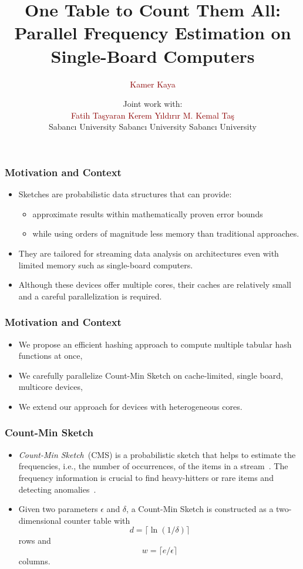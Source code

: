 \documentclass{beamer}
\title[One Table to Count Them All: Parallel Frequency Estimation on Single-Board Computers] %
{One Table to Count Them All: \\Parallel Frequency Estimation on Single-Board Computers}
\author[Kamer Kaya] %
{\textcolor{darkred}{Kamer Kaya}}
\institute[Sabancı University] %
{
  \inst{}%
  Sabancı University, Turkey
}
\date[] %
{
\sepline
 {
 Joint work with: \\ 
 \vspace{4mm}
 \textcolor{darkred}{Fatih Taşyaran} \hspace{9mm} 
 \textcolor{darkred}{Kerem Yıldırır} \hspace{9mm} 
 \textcolor{darkred}{M. Kemal Taş} \\
 \hspace{-0ex}
 {\tiny Sabancı University} \hspace{9ex}
 {\tiny Sabancı University}  \hspace{9ex}
  {\tiny Sabancı University} 
 }
\sepline
 }
\begin{document}
 
\frame{\titlepage}
 
\begin{frame}
	\frametitle{Motivation and Context}
	\begin{itemize}
	\item Sketches are probabilistic data structures that can provide:
	\begin{itemize}
	\item approximate results within mathematically proven error bounds 
	\item while using orders of magnitude less memory than traditional approaches.
	\end{itemize}
	\item They are tailored for streaming data analysis on architectures even with limited memory such as single-board computers.
	\item Although these devices offer multiple cores, their caches are relatively small and a careful parallelization is required.

\end{itemize}
\end{frame}

\begin{frame}
	\frametitle{Motivation and Context}
		\begin{itemize}
	\item We propose an efficient hashing approach to compute multiple tabular hash functions at once,
	\item We carefully parallelize Count-Min Sketch on cache-limited, single board, multicore devices,
	\item We extend our approach for devices with heterogeneous cores.

\end{itemize}
\end{frame}

\begin{frame}
\frametitle{Count-Min Sketch}
\begin{itemize}
\item
{\it Count-Min Sketch}~(CMS) is a probabilistic sketch that helps to estimate the frequencies, i.e., the number of occurrences, of the items in a stream~\cite{cormode2005}. The frequency  information is crucial to find heavy-hitters or rare items and detecting anomalies~\cite{cormode2003,cormode2005}.
       
\item Given two parameters $\epsilon$ and $\delta$, a Count-Min Sketch is constructed as a two-dimensional counter table with 
$$d=\lceil \ln(1/\delta) \rceil$$ rows and $$w=\lceil e/\epsilon \rceil$$ columns.
     \end{itemize}
\end{frame}
\end{document}
